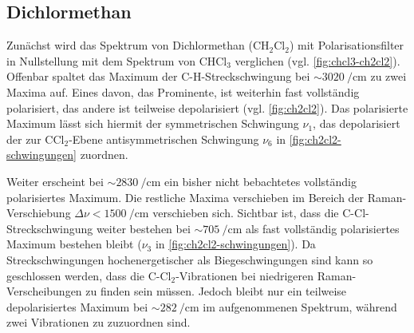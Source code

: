 \documentclass[../bericht.tex]{subfiles}
\begin{document}
      \subsection{Dichlormethan}

        Zunächst wird das Spektrum von Dichlormethan ($\mathrm{CH_2Cl_2}$) mit Polarisationsfilter in Nullstellung mit dem Spektrum von $\mathrm{CHCl_3}$ verglichen (vgl. \cref{fig:chcl3-ch2cl2}). Offenbar spaltet das Maximum der C-H-Streckschwingung bei $\sim\SI{3020}{\per\centi\meter}$ zu zwei Maxima auf. Eines davon, das Prominente, ist weiterhin fast vollständig polarisiert, das andere ist teilweise depolarisiert (vgl. \cref{fig:ch2cl2}). Das polarisierte Maximum lässt sich hiermit der symmetrischen Schwingung $\nu_1$, das depolarisiert der zur $\mathrm{CCl_2}$-Ebene antisymmetrischen Schwingung $\nu_6$ in \cref{fig:ch2cl2-schwingungen} zuordnen.

        Weiter erscheint bei $\sim\SI{2830}{\per\centi\meter}$ ein bisher nicht bebachtetes vollständig polarisiertes Maximum. Die restliche Maxima verschieben im Bereich der Raman-Verschiebung $\Delta \nu < \SI{1500}{\per\centi\meter}$ verschieben sich. Sichtbar ist, dass die C-Cl-Streckschwingung weiter bestehen bei $\sim\SI{705}{\per\centi\meter}$ als fast vollständig polarisiertes Maximum bestehen bleibt ($\nu_3$ in \cref{fig:ch2cl2-schwingungen}). Da Streckschwingungen hochenergetischer als Biegeschwingungen sind kann so geschlossen werden, dass die C-$\mathrm{Cl_2}$-Vibrationen bei niedrigeren Raman-Verscheibungen zu finden sein müssen. Jedoch bleibt nur ein teilweise depolarisiertes Maximum bei $\sim\SI{282}{\per\centi\meter}$ im aufgenommenen Spektrum, während zwei Vibrationen zu zuzuordnen sind. 
\end{document}
